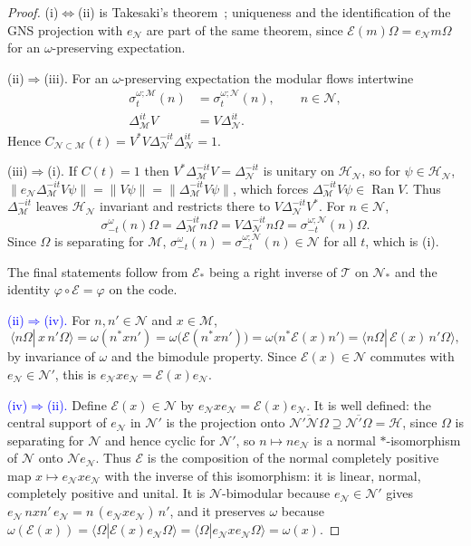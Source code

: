 \documentclass[a4paper,11pt]{article}
\theoremstyle{definition}
\newcommand{\nn}{\nonumber}
\newcommand{\mN}{\mathcal{N}}
\newcommand{\mH}{\mathcal{H}}
\newcommand{\mM}{\mathcal{M}}
\newcommand{\NL}[1]{\textcolor{blue}{#1}}
\newcommand{\mE}{\mathcal{E}}
\begin{document}
\begin{proof}
(i)$\Leftrightarrow$(ii) is Takesaki's theorem~\cite{Takesaki1972}; uniqueness and the identification of the GNS projection with $e_{\mN}$ are part of the same theorem, since $\mE(m)\Omega=e_{\mN}m\Omega$ for an $\omega$-preserving expectation.

(ii)$\Rightarrow$(iii). For an $\omega$-preserving expectation the modular flows intertwine
\begingroup\color{blue}
\begin{align}
 \sigma^{\omega;\mM}_t(n)&=\sigma^{\omega;\mN}_t(n),\qquad n\in\mN,\nn\\
 \Delta_{\mM}^{it}V&=V\Delta_{\mN}^{it}.
 \label{eq:takesaki-intertwining}
\end{align}
\endgroup Hence
$C_{\mN\subset\mM}(t)=V^*V\Delta_{\mN}^{-it}\Delta_{\mN}^{it}=1$.

(iii)$\Rightarrow$(i). If $C(t)=1$ then $V^*\Delta_{\mM}^{-it}V=\Delta_{\mN}^{-it}$ is unitary on $\mH_{\mN}$, so for $\psi\in\mH_{\mN}$,
$\|e_{\mN}\Delta_{\mM}^{-it}V\psi\|=\|V\psi\|=\|\Delta_{\mM}^{-it}V\psi\|$,
which forces $\Delta_{\mM}^{-it}V\psi\in\operatorname{Ran}V$. Thus $\Delta_{\mM}^{-it}$ leaves $\mH_{\mN}$ invariant and restricts there to $V\Delta_{\mN}^{-it}V^*$. For $n\in\mN$,
\[
 \sigma^{\omega}_{-t}(n)\Omega=\Delta_{\mM}^{-it}n\Omega
 =V\Delta_{\mN}^{-it}n\Omega=\sigma^{\omega;\mN}_{-t}(n)\Omega .
\]
Since $\Omega$ is separating for $\mM$, $\sigma^{\omega}_{-t}(n)=\sigma^{\omega;\mN}_{-t}(n)\in\mN$ for all $t$, which is (i).

The final statements follow from $\mE_*$ being a right inverse of $\mathcal T$ on $\mN_*$ and the identity $\varphi\circ\mE=\varphi$ on the code.

\NL{(ii)$\Rightarrow$(iv).} For $n,n'\in\mN$ and $x\in\mM$,
\[
 \langle n\Omega|\,x\,n'\Omega\rangle=\omega(n^*xn')=\omega\bigl(\mE(n^*xn')\bigr)=\omega\bigl(n^*\mE(x)n'\bigr)=\langle n\Omega|\,\mE(x)\,n'\Omega\rangle,
\]
by invariance of $\omega$ and the bimodule property. Since $\mE(x)\in\mN$ commutes with $e_{\mN}\in\mN'$, this is $e_{\mN}xe_{\mN}=\mE(x)e_{\mN}$.

\NL{(iv)$\Rightarrow$(ii).} Define $\mE(x)\in\mN$ by $e_{\mN}xe_{\mN}=\mE(x)e_{\mN}$. It is well defined: the central support of $e_{\mN}$ in $\mN'$ is the projection onto $\overline{\mN'\mN\Omega}\supseteq\overline{\mN'\Omega}=\mathcal H$, since $\Omega$ is separating for $\mN$ and hence cyclic for $\mN'$, so $n\mapsto ne_{\mN}$ is a normal $*$-isomorphism of $\mN$ onto $\mN e_{\mN}$. Thus $\mE$ is the composition of the normal completely positive map $x\mapsto e_{\mN}xe_{\mN}$ with the inverse of this isomorphism: it is linear, normal, completely positive and unital. It is $\mN$-bimodular because $e_{\mN}\in\mN'$ gives $e_{\mN}\,nxn'\,e_{\mN}=n\,(e_{\mN}xe_{\mN})\,n'$, and it preserves $\omega$ because $\omega(\mE(x))=\langle\Omega|\mE(x)e_{\mN}\Omega\rangle=\langle\Omega|e_{\mN}xe_{\mN}\Omega\rangle=\omega(x)$.
\end{proof}
\end{document}
